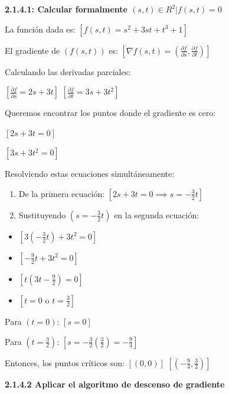 \documentclass[11pt]{article}
\providecommand{\tightlist}{%
      \setlength{\itemsep}{0pt}\setlength{\parskip}{0pt}}
\begin{document}
    \textbf{2.1.4.1: Calcular formalmente
\({ (s, t) ∈ R^{2} | f(s, t) = 0 }\)}

La función dada es: \([ f(s, t) = s^2 + 3st + t^3 + 1 ]\)

El gradiente de \(( f(s, t) )\) es:
\([ \nabla f(s, t) = \left( \frac{\partial f}{\partial s}, \frac{\partial f}{\partial t} \right) ]\)

Calculando las derivadas parciales:

\([ \frac{\partial f}{\partial s} = 2s + 3t ]\)
\([ \frac{\partial f}{\partial t} = 3s + 3t^2 ]\)

Queremos encontrar los puntos donde el gradiente es cero:

\([ 2s + 3t = 0 ]\)

\([ 3s + 3t^2 = 0 ]\)

Resolviendo estas ecuaciones simultáneamente:

\begin{enumerate}
\def\labelenumi{\arabic{enumi}.}
\item
  De la primera ecuación: \([ 2s + 3t = 0 \implies s = -\frac{3}{2}t ]\)
\item
  Sustituyendo \(( s = -\frac{3}{2}t )\) en la segunda ecuación:
\end{enumerate}

\begin{itemize}
\tightlist
\item
  \([ 3\left(-\frac{3}{2}t\right) + 3t^2 = 0 ]\)
\item
  \([ -\frac{9}{2}t + 3t^2 = 0 ]\)
\item
  \([ t(3t - \frac{9}{2}) = 0 ]\)
\item
  \([ t = 0 \text{ o } t = \frac{3}{2} ]\)
\end{itemize}

Para \(( t = 0 )\): \([ s = 0 ]\)

Para \(( t = \frac{3}{2} )\):
\([ s = -\frac{3}{2} \left(\frac{3}{2}\right) = -\frac{9}{4} ]\)

Entonces, los puntos críticos son: \([ (0, 0) ]\)
\([ \left(-\frac{9}{4}, \frac{3}{2}\right) ]\)

    \textbf{2.1.4.2 Aplicar el algoritmo de descenso de gradiente}
\end{document}
